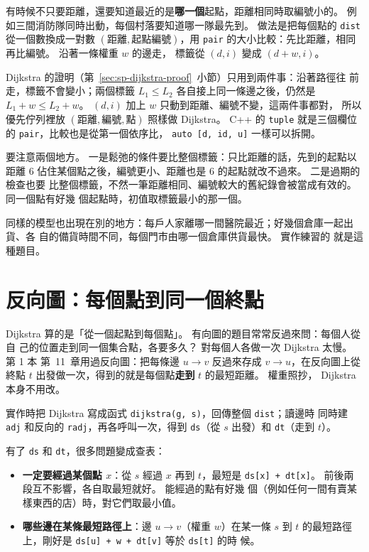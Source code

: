 有時候不只要距離，還要知道最近的是\textbf{哪一個}起點，距離相同時取編號小的。
例如三間消防隊同時出動，每個村落要知道哪一隊最先到。 做法是把每個點的
\texttt{dist} 從一個數換成一對數 $(\text{距離}, \text{起點編號})$，用
\texttt{pair} 的大小比較：先比距離，相同再比編號。 沿著一條權重 $w$ 的邊走，
標籤從 $(d, i)$ 變成 $(d + w, i)$。

Dijkstra 的證明（第~\ref{sec:sp-dijkstra-proof}~小節）只用到兩件事：沿著路徑往
前走，標籤不會變小；兩個標籤 $L_1 \le L_2$ 各自接上同一條邊之後，仍然是
$L_1 + w \le L_2 + w$。 $(d, i)$ 加上 $w$ 只動到距離、編號不變，這兩件事都對，
所以優先佇列裡放 $(\text{距離}, \text{編號}, \text{點})$ 照樣做 Dijkstra。 C++
的 \texttt{tuple} 就是三個欄位的 \texttt{pair}，比較也是從第一個依序比，
\texttt{auto [d, id, u]} 一樣可以拆開。

要注意兩個地方。 一是鬆弛的條件要比整個標籤：只比距離的話，先到的起點以距離 $6$
佔住某個點之後，編號更小、距離也是 $6$ 的起點就改不過來。 二是過期的檢查也要
比整個標籤，不然一筆距離相同、編號較大的舊紀錄會被當成有效的。 同一個點有好幾
個起點時，初值取標籤最小的那一個。

同樣的模型也出現在別的地方：每戶人家離哪一間醫院最近；好幾個倉庫一起出貨、各
自的備貨時間不同，每個門市由哪一個倉庫供貨最快。 實作練習的
就是這種題目。

\section{反向圖：每個點到同一個終點}
\label{sec:sp-reverse}

Dijkstra 算的是「從一個起點到每個點」。 有向圖的題目常常反過來問：每個人從自
己的位置走到同一個集合點，各要多久？ 對每個人各做一次 Dijkstra 太慢。 第 1 本
第~11~章用過反向圖：把每條邊 $u \to v$ 反過來存成 $v \to u$，在反向圖上從終點
$t$ 出發做一次，得到的就是每個點\textbf{走到} $t$ 的最短距離。 權重照抄，
Dijkstra 本身不用改。

實作時把 Dijkstra 寫成函式 \texttt{dijkstra(g, s)}，回傳整個 \texttt{dist}；讀邊時
同時建 \texttt{adj} 和反向的 \texttt{radj}，再各呼叫一次，得到 \texttt{ds}（從 $s$
出發）和 \texttt{dt}（走到 $t$）。

有了 \texttt{ds} 和 \texttt{dt}，很多問題變成查表：

\begin{itemize}
\item \textbf{一定要經過某個點 $x$}：從 $s$ 經過 $x$ 再到 $t$，最短是
\texttt{ds[x] + dt[x]}。 前後兩段互不影響，各自取最短就好。 能經過的點有好幾
個（例如任何一間有賣某樣東西的店）時，對它們取最小值。
\item \textbf{哪些邊在某條最短路徑上}：邊 $u \to v$（權重 $w$）在某一條 $s$ 到
$t$ 的最短路徑上，剛好是 \texttt{ds[u] + w + dt[v]} 等於 \texttt{ds[t]} 的時
候。
\end{itemize}

